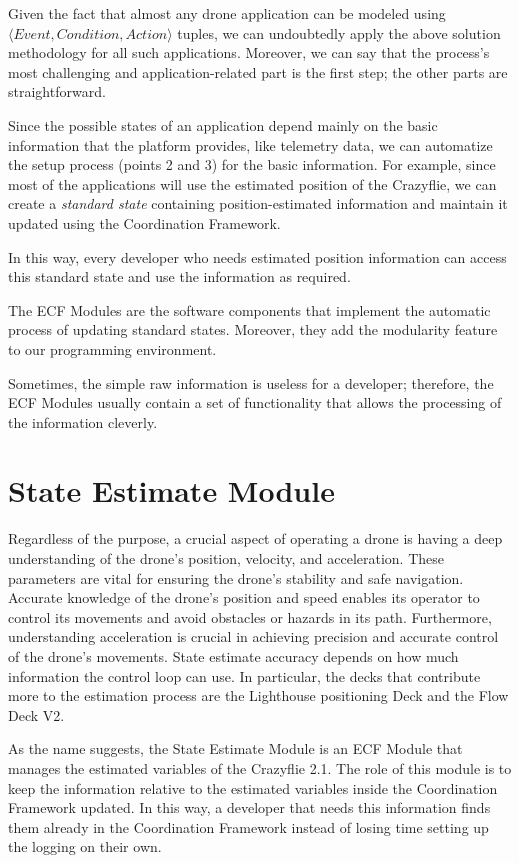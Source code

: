 Given the fact that almost any drone application can be modeled using\\
\( \langle Event, Condition, Action \rangle \) tuples, we can undoubtedly apply the above solution methodology for all such applications.
Moreover, we can say that the process's most challenging and application-related part is the first step; the other parts are straightforward.

Since the possible states of an application depend mainly on the basic information that the platform provides, like telemetry data, we can automatize the setup process (points 2 and 3) for the basic information.
For example, since most of the applications will use the estimated position of the Crazyflie, we can create a \textit{standard state} containing position-estimated information and maintain it updated using the Coordination Framework.

In this way, every developer who needs estimated position information can access this standard state and use the information as required.

The ECF Modules are the software components that implement the automatic process of updating standard states. Moreover, they add the modularity feature to our programming environment.

Sometimes, the simple raw information is useless for a developer; therefore, the ECF Modules usually contain a set of functionality that allows the processing of the information cleverly. 


\section{State Estimate Module}\label{sec:module_state_estimate}
Regardless of the purpose, a crucial aspect of operating a drone is having a deep understanding of the drone's position, velocity, and acceleration. 
These parameters are vital for ensuring the drone's stability and safe navigation. 
Accurate knowledge of the drone's position and speed enables its operator to control its movements and avoid obstacles or hazards in its path. 
Furthermore, understanding acceleration is crucial in achieving precision and accurate control of the drone's movements.
State estimate accuracy depends on how much information the control loop can use. 
In particular, the decks that contribute more to the estimation process are the Lighthouse positioning Deck and the Flow Deck V2. 

As the name suggests, the State Estimate Module is an ECF Module that manages the estimated variables of the Crazyflie 2.1.
The role of this module is to keep the information relative to the estimated variables inside the Coordination Framework updated.
In this way, a developer that needs this information finds them already in the Coordination Framework instead of losing time setting up the logging on their own.

